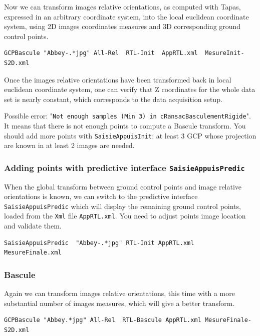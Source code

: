 Now we can transform images relative orientations, as computed with Tapas, expressed in an arbitrary coordinate system,
into the local euclidean coordinate system, using 2D images coordinates measures and 3D corresponding ground control points.

\begin{verbatim}
GCPBascule "Abbey-.*jpg" All-Rel  RTL-Init  AppRTL.xml  MesureInit-S2D.xml
\end{verbatim}

Once the images relative orientations have been transformed back in local euclidean coordinate system, one can verify that Z coordinates for the whole data set is nearly constant, which corresponds to the data acquisition setup.

\vspace{\baselineskip}
Possible error: "{\tt Not enough samples (Min 3) in cRansacBasculementRigide}". It means that there is not enough points to compute a Bascule transform. You should add more points with {\tt SaisieAppuisInit}:
at least 3 GCP whose projection are known in at least 2 images are needed.

\subsubsection{Adding points with predictive interface {\tt SaisieAppuisPredic}}

When the global transform between ground control points and image relative orientations is known, we can switch to the predictive interface {\tt SaisieAppuisPredic} which will display the remaining ground control points, loaded from the {\tt Xml} file {\tt AppRTL.xml}.
You need to adjust points image location and validate them.

\begin{verbatim}
SaisieAppuisPredic  "Abbey-.*jpg" RTL-Init AppRTL.xml  MesureFinale.xml
\end{verbatim}

\subsubsection{Bascule}

Again we can transform images relative orientations, this time with a more substantial number of images measures, which will give a better transform.
\begin{verbatim}
GCPBascule "Abbey.*jpg" All-Rel  RTL-Bascule AppRTL.xml MesureFinale-S2D.xml
\end{verbatim}

